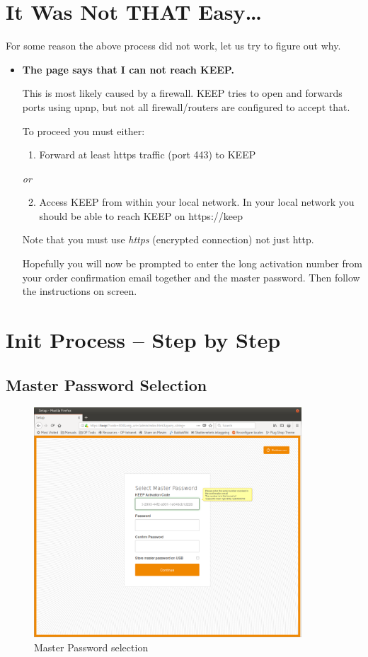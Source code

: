 \documentclass[12pt,a4paper,titlepage]{article}
\begin{document}
\section{It Was Not THAT Easy\ldots}
For some reason the above process did not work, let us try to figure out why.
\begin{itemize}
\item \textbf{The page says that I can not reach KEEP.}

This is most likely caused by a firewall. KEEP tries to open and forwards ports using upnp, but not all firewall/routers are configured to accept that.

To proceed you must either:
\begin{enumerate}
\item Forward at least https traffic (port 443) to KEEP
\end{enumerate}
\emph{or}
\begin{enumerate}
\setcounter{enumi}{1}
\item Access KEEP from within your local network. In your local network you should be able to reach KEEP on https://keep
\end{enumerate}

Note that you must use \emph{https} (encrypted connection) not just http.

Hopefully you will now be prompted to enter the long activation number from your order confirmation email together and the master password.
Then follow the instructions on screen.
\end{itemize}
\FloatBarrier
\newpage
\section{Init Process – Step by Step}
\subsection{Master Password Selection}
\begin{figure}[h!]
\centering
\includegraphics[width=10cm]{./img/master_pwd}
\caption{Master Password selection}
\end{figure}
\end{document}
